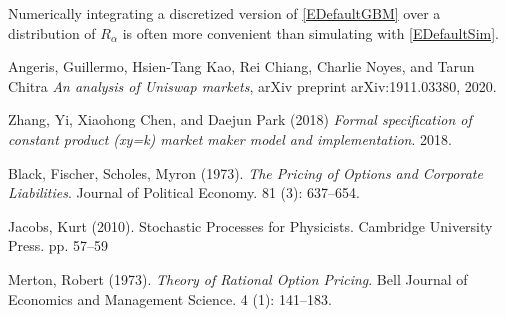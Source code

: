\documentclass[12pt]{article}
\begin{document}
Numerically integrating a discretized version of \ref{EDefaultGBM} over a distribution of $R_\alpha$ is often more convenient than simulating with \ref{EDefaultSim}.







\begin{thebibliography}{}
 Angeris, Guillermo, Hsien-Tang Kao, Rei Chiang, Charlie Noyes, and Tarun Chitra  \textit{An analysis of Uniswap markets}, arXiv preprint arXiv:1911.03380, 2020.

 Zhang, Yi, Xiaohong Chen, and Daejun Park (2018) \textit{Formal specification of constant product (xy=k) market maker model and implementation}. 2018.

 Black, Fischer, Scholes, Myron (1973). \textit{The Pricing of Options and Corporate Liabilities}. Journal of Political Economy. 81 (3): 637–654. 

 Jacobs, Kurt (2010). Stochastic Processes for Physicists. Cambridge University Press. pp. 57–59

 Merton, Robert (1973). \textit{Theory of Rational Option Pricing}. Bell Journal of Economics and Management Science. 4 (1): 141–183.




\end{thebibliography}
\end{document}
